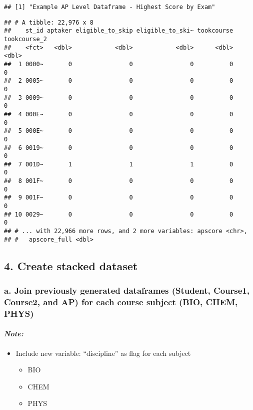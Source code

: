 \documentclass[]{article}
\providecommand{\tightlist}{%
  \setlength{\itemsep}{0pt}\setlength{\parskip}{0pt}}
\let\oldparagraph\paragraph
\renewcommand{\paragraph}[1]{\oldparagraph{#1}\mbox{}}
\begin{document}
\begin{verbatim}
## [1] "Example AP Level Dataframe - Highest Score by Exam"
\end{verbatim}

\begin{verbatim}
## # A tibble: 22,976 x 8
##    st_id aptaker eligible_to_skip eligible_to_ski~ tookcourse tookcourse_2
##    <fct>   <dbl>            <dbl>            <dbl>      <dbl>        <dbl>
##  1 0000~       0                0                0          0            0
##  2 0005~       0                0                0          0            0
##  3 0009~       0                0                0          0            0
##  4 000E~       0                0                0          0            0
##  5 000E~       0                0                0          0            0
##  6 0019~       0                0                0          0            0
##  7 001D~       1                1                1          0            0
##  8 001F~       0                0                0          0            0
##  9 001F~       0                0                0          0            0
## 10 0029~       0                0                0          0            0
## # ... with 22,966 more rows, and 2 more variables: apscore <chr>,
## #   apscore_full <dbl>
\end{verbatim}

\subsection{4. Create stacked dataset}\label{create-stacked-dataset}

\subsubsection{a. Join previously generated dataframes (Student,
Course1, Course2, and AP) for each course subject (BIO, CHEM,
PHYS)}\label{a.-join-previously-generated-dataframes-student-course1-course2-and-ap-for-each-course-subject-bio-chem-phys}

\paragraph{\texorpdfstring{\emph{Note:}}{Note:}}\label{note-5}

\begin{itemize}
\tightlist
\item
  Include new variable: ``discipline'' as flag for each subject

  \begin{itemize}
  \tightlist
  \item
    BIO
  \item
    CHEM
  \item
    PHYS
  \end{itemize}
\end{itemize}
\end{document}
